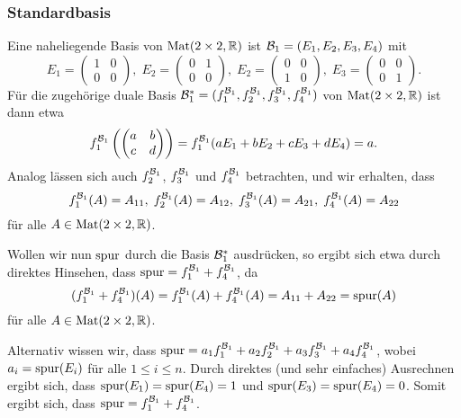 \documentclass[a4paper,10pt]{article}
\begin{document}
\subsubsection{Standardbasis}

Eine naheliegende Basis von $\mathrm{Mat}(2 \times 2, \mathbb{R})$ ist $\mathcal{B}_1 = (E_1, E_2, E_3, E_4)$ mit
\[
 E_1 = \begin{pmatrix} 1 & 0 \\ 0 & 0 \end{pmatrix}, \;
 E_2 = \begin{pmatrix} 0 & 1 \\ 0 & 0 \end{pmatrix}, \;
 E_2 = \begin{pmatrix} 0 & 0 \\ 1 & 0 \end{pmatrix}, \;
 E_3 = \begin{pmatrix} 0 & 0 \\ 0 & 1 \end{pmatrix}.
\]
Für die zugehörige duale Basis $\mathcal{B}_1^* = (f^{\mathcal{B}_1}_1, f^{\mathcal{B}_1}_2, f^{\mathcal{B}_1}_3, f^{\mathcal{B}_1}_4)$ von $\mathrm{Mat}(2 \times 2, \mathbb{R})$ ist dann etwa
\[
 f^{\mathcal{B}_1}_1\left( \begin{pmatrix} a & b \\ c & d \end{pmatrix} \right)
 = f^{\mathcal{B}_1}_1( a E_1 + b E_2 + c E_3 + d E_4 )
 = a.
\]
Analog lässen sich auch $f^{\mathcal{B}_1}_2$, $f^{\mathcal{B}_1}_3$ und $f^{\mathcal{B}_1}_4$ betrachten, und wir erhalten, dass
\[
 f^{\mathcal{B}_1}_1(A) = A_{11}, \;
 f^{\mathcal{B}_1}_2(A) = A_{12}, \;
 f^{\mathcal{B}_1}_3(A) = A_{21}, \;
 f^{\mathcal{B}_1}_4(A) = A_{22}
\]
für alle $A \in \mathrm{Mat}(2 \times 2, \mathbb{R})$.

Wollen wir nun $\mathrm{spur}$ durch die Basis $\mathcal{B}_1^*$ ausdrücken, so ergibt sich etwa durch direktes Hinsehen, dass $\mathrm{spur} = f^{\mathcal{B}_1}_1 + f^{\mathcal{B}_1}_4$, da
\[
 (f^{\mathcal{B}_1}_1 + f^{\mathcal{B}_1}_4)(A)
 = f^{\mathcal{B}_1}_1(A) + f^{\mathcal{B}_1}_4(A)
 = A_{11} + A_{22}
 = \mathrm{spur}(A)
\]
für alle $A \in \mathrm{Mat}(2 \times 2, \mathbb{R})$.

Alternativ wissen wir, dass $\mathrm{spur} = a_1 f^{\mathcal{B}_1}_1 + a_2 f^{\mathcal{B}_1}_2 + a_3 f^{\mathcal{B}_1}_3 + a_4 f^{\mathcal{B}_1}_4$, wobei $a_i = \mathrm{spur}(E_i)$ für alle $1 \leq i \leq n$. Durch direktes (und sehr einfaches) Ausrechnen ergibt sich, dass $\mathrm{spur}(E_1) = \mathrm{spur}(E_4) = 1$ und \mbox{$\mathrm{spur}(E_3) = \mathrm{spur}(E_4) = 0$}. Somit ergibt sich, dass $\mathrm{spur} = f^{\mathcal{B}_1}_1 + f^{\mathcal{B}_1}_4$.
\end{document}
